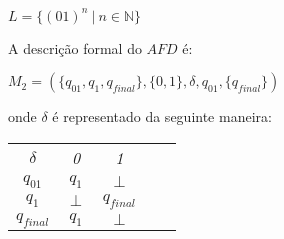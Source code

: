 \documentclass{article}
\begin{document}
\begin{prob}
  $L = \{(01)^n \ | \ n \in \mathbb{N}\}$

  \begin{center}
  \end{center}
  \pagebreak
  A descrição formal do $AFD$ é:
  \begin{center}
    $M_2 = (\{q_{01},q_{1},q_{final}\}, \{0,1\},\delta,q_{01}, \{q_{final}\})$
  \end{center}
  onde $\delta$ é representado da seguinte maneira:
  \begin{table}[htbp]
    \centering
    \begin{tabular}{c|ccll}
      \textit{$\delta$}    & \textit{0}       & \textit{1}           & \textit{} & \textit{} \\ \cline{1-3}
      \textit{$q_{01}$}    & \textit{$q_{1}$} & \textit{$\perp$}     & \textit{} & \textit{} \\
      \textit{$q_{1}$}     & \textit{$\perp$} & \textit{$q_{final}$} & \textit{} & \textit{} \\
      \textit{$q_{final}$} & \textit{$q_1$}   & \textit{$\perp$}     & \textit{} & \textit{}
    \end{tabular}
  \end{table}
\end{prob}
\end{document}
